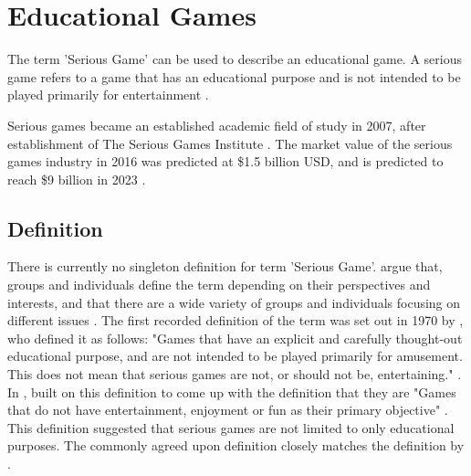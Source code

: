 \documentclass[a4paper,11.5pt]{report}
\numberwithin{figure}{section}
\numberwithin{table}{section}
\numberwithin{equation}{section}
\numberwithin{equation}{section}
\begin{document}


\section{Educational Games}

The term 'Serious Game' can be used to describe an educational game. A serious game refers to a game that has an educational purpose and is not intended to be played primarily for entertainment \citep{abt1970}. 

Serious games became an established academic field of study in 2007, after establishment of The Serious Games Institute \citep{Wilkinson2016}. The market value of the serious games industry in 2016 was predicted at \$1.5 billion USD, and is predicted to reach \$9 billion in 2023 \citep{alliedmarketresearch}.

\subsection{Definition}

There is currently no singleton definition for term 'Serious Game'. \citeauthor{Johann2015} argue that, groups and individuals define the term depending on their perspectives and interests, and that there are a wide variety of groups and individuals focusing on different issues \citep{Johann2015}. The first recorded definition of the term was set out in 1970 by \citeauthor{abt1970} \citep{Wilkinson2016}, who defined it as follows: "Games that have an explicit and carefully thought-out educational purpose, and are not intended to be played primarily for amusement. This does not mean that serious games are not, or should not be, entertaining." \citep{abt1970}. In \citeyear{Michael2005}, \citeauthor{Michael2005} built on this definition to come up with the definition that they are "Games that do not have entertainment, enjoyment or fun as their primary objective" \citep{Michael2005}. This definition suggested that serious games are not limited to only educational purposes. The commonly agreed upon definition closely matches the definition by \citeauthor{Michael2005} \citep[see][]{Johann2015}.
\end{document}
